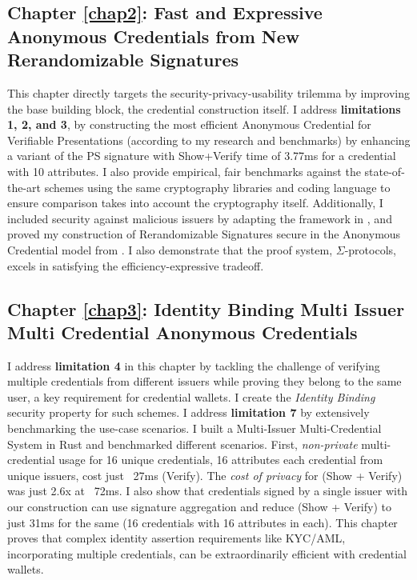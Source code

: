 \subsection{Chapter \ref{chap2}: Fast and Expressive Anonymous Credentials from New Rerandomizable Signatures}
This chapter directly targets the security-privacy-usability trilemma by improving the base building block, the credential construction itself. I address \textbf{limitations 1, 2, and 3}, by constructing the most efficient Anonymous Credential for Verifiable Presentations (according to my research and benchmarks) by enhancing a variant \cite{tomescu_utt_2022} of the PS signature \cite{sako_short_2016} with Show+Verify time of 3.77ms for a credential with 10 attributes. I also provide empirical, fair benchmarks against the state-of-the-art schemes \cite{hutchison_constant-size_2006, camenisch_anonymous_2016, sako_short_2016, tomescu_utt_2022} using the same cryptography libraries and coding language to ensure comparison takes into account the cryptography itself. Additionally, I included security against malicious issuers by adapting the framework in \cite{fuchsbauer_structure-preserving_2019}, and proved my construction of Rerandomizable Signatures secure in the Anonymous Credential model from \cite{fuchsbauer_structure-preserving_2019}. I also demonstrate that the proof system, $\Sigma$-protocols, excels in satisfying the efficiency-expressive tradeoff. 


\subsection{Chapter \ref{chap3}: Identity Binding Multi Issuer Multi Credential Anonymous Credentials}
I address \textbf{limitation 4} in this chapter by tackling the challenge of verifying multiple credentials from different issuers while proving they belong to the same user, a key requirement for credential wallets. I create the \emph{Identity Binding} security property for such schemes. I address \textbf{limitation 7} by extensively benchmarking the use-case scenarios. I built a Multi-Issuer Multi-Credential System in Rust and benchmarked different scenarios. First, \emph{non-private} multi-credential usage for 16 unique credentials, 16 attributes each credential from unique issuers, cost just ~27ms (Verify). The \emph{cost of privacy} for (Show + Verify) was just 2.6x at ~72ms. I also show that credentials signed by a single issuer with our construction can use signature aggregation and reduce (Show + Verify) to just 31ms for the same (16 credentials with 16 attributes in each). This chapter proves that complex identity assertion requirements like KYC/AML, incorporating multiple credentials, can be extraordinarily efficient with credential wallets.


